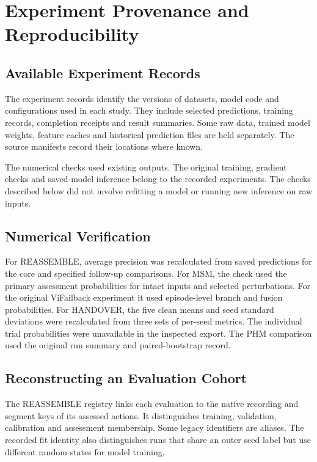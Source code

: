 \chapter{Experiment Provenance and Reproducibility}
\label{app:reproducibility}

\section{Available Experiment Records}
The experiment records identify the versions of datasets, model code and configurations used in each study. They include selected predictions, training records, completion receipts and result summaries. Some raw data, trained model weights, feature caches and historical prediction files are held separately. The source manifests record their locations where known.

The numerical checks used existing outputs. The original training, gradient checks and saved-model inference belong to the recorded experiments. The checks described below did not involve refitting a model or running new inference on raw inputs.

\section{Numerical Verification}
For REASSEMBLE, average precision was recalculated from saved predictions for the core and specified follow-up comparisons. For MSM, the check used the primary assessment probabilities for intact inputs and selected perturbations. For the original ViFailback experiment it used episode-level branch and fusion probabilities. For HANDOVER, the five clean means and seed standard deviations were recalculated from three sets of per-seed metrics. The individual trial probabilities were unavailable in the inspected export. The PHM comparison used the original run summary and paired-bootstrap record.

\section{Reconstructing an Evaluation Cohort}
The REASSEMBLE registry links each evaluation to the native recording and segment keys of its assessed actions. It distinguishes training, validation, calibration and assessment membership. Some legacy identifiers are aliases. The recorded fit identity also distinguishes runs that share an outer seed label but use different random states for model training.

